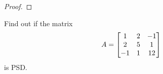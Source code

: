 \documentclass{exam}
\begin{document}
    \begin{proof}
    \end{proof}
    \begin{question}
        Find out if the matrix
        \[
            A = \matrix{ 1 & 2 & -1 \\ 2 & 5 & 1 \\ -1 & 1 & 12}
        \]
        is PSD.
    \end{question}
\end{document}
